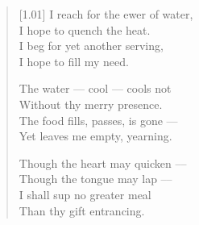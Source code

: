 \begin{verse}[1.01\textwidth]
  I reach for the ewer of water,\\
  I hope to quench the heat.\\
  I beg for yet another serving,\\
  I hope to fill my need.

  The water --- cool --- cools not\\
  Without thy merry presence.\\
  The food fills, passes, is gone ---\\
  Yet leaves me empty, yearning.

  Though the heart may quicken –--\\
  Though the tongue may lap –--\\
  I shall sup no greater meal\\
  Than thy gift entrancing.
\end{verse}
